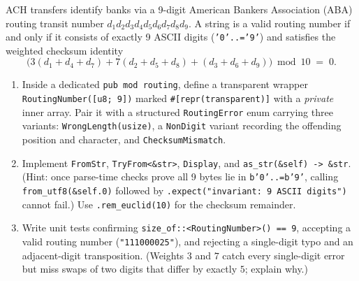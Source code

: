 \begin{exercise}
ACH transfers identify banks via a 9-digit American Bankers Association (ABA) routing transit number $d_1 d_2 d_3 d_4 d_5 d_6 d_7 d_8 d_9$. A string is a valid routing number if and only if it consists of exactly 9 ASCII digits (\texttt{'0'..='9'}) and satisfies the weighted checksum identity
\[
  \bigl(3(d_1 + d_4 + d_7) + 7(d_2 + d_5 + d_8) + (d_3 + d_6 + d_9)\bigr) \bmod 10 \;=\; 0.
\]
\begin{enumerate}[label=(\alph*)]
  \item Inside a dedicated \texttt{pub mod routing}, define a transparent wrapper \texttt{Routing\allowbreak{}Number(\allowbreak{}[u8; 9])} marked \texttt{\#[repr(\allowbreak{}transparent)]} with a \emph{private} inner array. Pair it with a structured \texttt{Routing\allowbreak{}Error} enum carrying three variants: \texttt{Wrong\allowbreak{}Length(usize)}, a \texttt{NonDigit} variant recording the offending position and character, and \texttt{Checksum\allowbreak{}Mismatch}.
  \item Implement \texttt{FromStr}, \texttt{TryFrom<\&str>}, \texttt{Display}, and \texttt{as\_str(\&self) -> \&str}. (Hint: once parse-time checks prove all 9 bytes lie in \texttt{b'0'..=b'9'}, calling \texttt{from\_utf8(\&self.0)} followed by \texttt{.expect(\allowbreak{}"invariant: 9 ASCII digits")} cannot fail.) Use \texttt{.rem\_euclid(10)} for the checksum remainder.
  \item Write unit tests confirming \texttt{size\_of::<RoutingNumber>() == 9}, accepting a valid routing number (\texttt{"111000025"}), and rejecting a single-digit typo and an adjacent-digit transposition. (Weights $3$ and $7$ catch every single-digit error but miss swaps of two digits that differ by exactly $5$; explain why.)
\end{enumerate}
\end{exercise}

